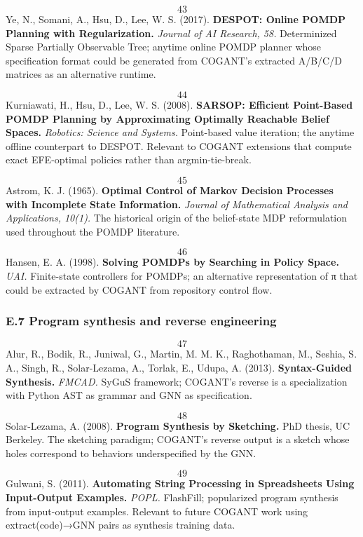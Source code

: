 \documentclass[
]{article}
\begin{document}
\[43\] Ye, N., Somani, A., Hsu, D., Lee, W. S. (2017). \textbf{DESPOT:
Online POMDP Planning with Regularization.} \emph{Journal of AI
Research, 58.} Determinized Sparse Partially Observable Tree; anytime
online POMDP planner whose specification format could be generated from
COGANT's extracted A/B/C/D matrices as an alternative runtime.

\[44\] Kurniawati, H., Hsu, D., Lee, W. S. (2008). \textbf{SARSOP:
Efficient Point-Based POMDP Planning by Approximating Optimally
Reachable Belief Spaces.} \emph{Robotics: Science and Systems.}
Point-based value iteration; the anytime offline counterpart to DESPOT.
Relevant to COGANT extensions that compute exact EFE-optimal policies
rather than argmin-tie-break.

\[45\] Astrom, K. J. (1965). \textbf{Optimal Control of Markov
Decision Processes with Incomplete State Information.} \emph{Journal of
Mathematical Analysis and Applications, 10(1).} The historical origin of
the belief-state MDP reformulation used throughout the POMDP literature.

\[46\] Hansen, E. A. (1998). \textbf{Solving POMDPs by Searching in
Policy Space.} \emph{UAI.} Finite-state controllers for POMDPs; an
alternative representation of π that could be extracted by COGANT from
repository control flow.

\subsubsection{E.7 Program synthesis and reverse
engineering}\label{e.7-program-synthesis-and-reverse-engineering}

\[47\] Alur, R., Bodik, R., Juniwal, G., Martin, M. M. K.,
Raghothaman, M., Seshia, S. A., Singh, R., Solar-Lezama, A., Torlak, E.,
Udupa, A. (2013). \textbf{Syntax-Guided Synthesis.} \emph{FMCAD.} SyGuS
framework; COGANT's reverse is a specialization with Python AST as
grammar and GNN as specification.

\[48\] Solar-Lezama, A. (2008). \textbf{Program Synthesis by
Sketching.} PhD thesis, UC Berkeley. The sketching paradigm; COGANT's
reverse output is a sketch whose holes correspond to behaviors
underspecified by the GNN.

\[49\] Gulwani, S. (2011). \textbf{Automating String Processing in
Spreadsheets Using Input-Output Examples.} \emph{POPL.} FlashFill;
popularized program synthesis from input-output examples. Relevant to
future COGANT work using extract(code)→GNN pairs as synthesis training
data.
\end{document}
